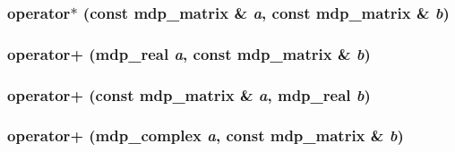 \label{classmdp__matrix_a0fc0749acc8f2a3f26f0daf14797a9e5}
\hypertarget{classmdp__matrix_acf7cf6445d6a42f2aa791bc1088a816f}{
\subsubsection[{operator$\ast$}]{ operator$\ast$ (const {\bf mdp\_\-matrix} \& {\em a}, \/  const {\bf mdp\_\-matrix} \& {\em b})}}
\label{classmdp__matrix_acf7cf6445d6a42f2aa791bc1088a816f}
\hypertarget{classmdp__matrix_ace32cb8f1638c0ff6917045e2d10f467}{
\subsubsection[{operator+}]{ operator+ ({\bf mdp\_\-real} {\em a}, \/  const {\bf mdp\_\-matrix} \& {\em b})}}
\label{classmdp__matrix_ace32cb8f1638c0ff6917045e2d10f467}
\hypertarget{classmdp__matrix_a2e4fb3c9d1e2be0e26120a1947eb895a}{
\subsubsection[{operator+}]{ operator+ (const {\bf mdp\_\-matrix} \& {\em a}, \/  {\bf mdp\_\-real} {\em b})}}
\label{classmdp__matrix_a2e4fb3c9d1e2be0e26120a1947eb895a}
\hypertarget{classmdp__matrix_a179b66f81eb9cc41cf4e47424fbb043a}{
\subsubsection[{operator+}]{ operator+ ({\bf mdp\_\-complex} {\em a}, \/  const {\bf mdp\_\-matrix} \& {\em b})}}
